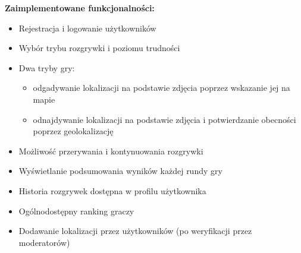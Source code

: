 \bigskip
\noindent
\textbf{Zaimplementowane funkcjonalności:}
\begin{itemize}
    \item Rejestracja i logowanie użytkowników
    \item Wybór trybu rozgrywki i poziomu trudności
    \item Dwa tryby gry:
          \begin{itemize}
              \item odgadywanie lokalizacji na podstawie zdjęcia poprzez wskazanie jej na mapie
              \item odnajdywanie lokalizacji na podstawie zdjęcia i potwierdzanie obecności poprzez geolokalizację
          \end{itemize}
    \item Możliwość przerywania i kontynuowania rozgrywki
    \item Wyświetlanie podsumowania wyników każdej rundy gry
    \item Historia rozgrywek dostępna w profilu użytkownika
    \item Ogólnodostępny ranking graczy
    \item Dodawanie lokalizacji przez użytkowników (po weryfikacji przez moderatorów)
\end{itemize}
